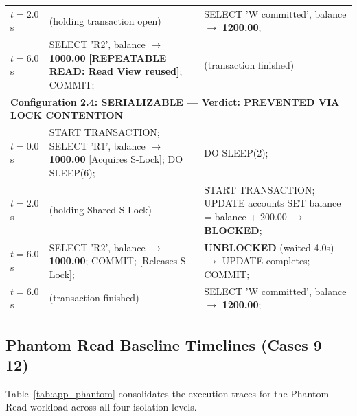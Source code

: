 \documentclass[sigconf, pbalance, nonacm]{acmart}
\begin{document}
\begin{table}[p]
\begin{tabularx}{\textwidth}{p{1.8cm} X X}
$t = 2.0$s & (holding transaction open) & SELECT 'W committed', balance $\rightarrow$ \textbf{1200.00}; \\
$t = 6.0$s & SELECT 'R2', balance $\rightarrow$ \textbf{1000.00} \textbf{[REPEATABLE READ: Read View reused]}; COMMIT; & (transaction finished) \\
\midrule
\multicolumn{3}{l}{\textbf{Configuration 2.4: SERIALIZABLE --- Verdict: PREVENTED VIA LOCK CONTENTION}} \\
$t = 0.0$s & START TRANSACTION; SELECT 'R1', balance $\rightarrow$ \textbf{1000.00} [Acquires S-Lock]; DO SLEEP(6); & DO SLEEP(2); \\
$t = 2.0$s & (holding Shared S-Lock) & START TRANSACTION; UPDATE accounts SET balance = balance + 200.00 $\rightarrow$ \textbf{BLOCKED}; \\
$t = 6.0$s & SELECT 'R2', balance $\rightarrow$ \textbf{1000.00}; COMMIT; [Releases S-Lock]; & \textbf{UNBLOCKED} (waited 4.0s) $\rightarrow$ UPDATE completes; COMMIT; \\
$t = 6.0$s & (transaction finished) & SELECT 'W committed', balance $\rightarrow$ \textbf{1200.00}; \\
\bottomrule
\end{tabularx}
\end{table}

\subsection{Phantom Read Baseline Timelines (Cases 9--12)}
Table~\ref{tab:app_phantom} consolidates the execution traces for the Phantom Read workload across all four isolation levels.
\end{document}
